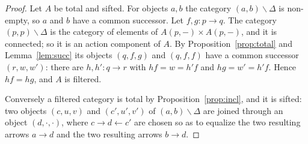 \begin{proof}
Let $A$ be total and sifted. For objects $a,b$ the category
$(a,b)\backslash\Delta$ is non-empty, so $a$ and $b$ have a common successor.
Let $f,g\colon p\to q$. The category $(p,p)\backslash\Delta$ is the category
of elements of $A(p,-)\times A(p,-)$, and it is connected; so it is an action
component of $A$. By Proposition~\ref{prop:total} and Lemma~\ref{lem:succ}
its objects $(q,f,g)$ and $(q,f,f)$ have a common successor $(r,w,w')$:
there are $h,h'\colon q\to r$ with $hf=w=h'f$ and $hg=w'=h'f$. Hence $hf=hg$,
and $A$ is filtered.

Conversely a filtered category is total by Proposition~\ref{prop:incl}, and
it is sifted: two objects $(c,u,v)$ and $(c',u',v')$ of
$(a,b)\backslash\Delta$ are joined through an object $(d,\cdot,\cdot)$, where
$c\to d\leftarrow c'$ are chosen so as to equalize the two resulting arrows
$a\to d$ and the two resulting arrows $b\to d$.
\end{proof}
